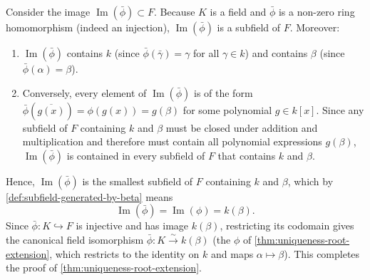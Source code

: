 \begin{proofWrapper}
\begin{content}
Consider the image $\operatorname{Im}(\bar{\phi}) \subset F$. Because $K$ is a field and $\bar{\phi}$ is a non-zero ring homomorphism (indeed an injection), $\operatorname{Im}(\bar{\phi})$ is a subfield of $F$. Moreover:
\begin{enumerate}[label=\textbf{(\arabic*)}]
    \item $\operatorname{Im}(\bar{\phi})$ contains $k$ (since $\bar{\phi}(\bar{\gamma}) = \gamma$ for all $\gamma \in k$) and contains $\beta$ (since $\bar{\phi}(\alpha) = \beta$).
    \item Conversely, every element of $\operatorname{Im}(\bar{\phi})$ is of the form $\bar{\phi}(\overline{g(x)}) = \phi(g(x)) = g(\beta)$ for some polynomial $g \in k[x]$. Since any subfield of $F$ containing $k$ and $\beta$ must be closed under addition and multiplication and therefore must contain all polynomial expressions $g(\beta)$, $\operatorname{Im}(\bar{\phi})$ is contained in every subfield of $F$ that contains $k$ and $\beta$.
\end{enumerate}
Hence, $\operatorname{Im}(\bar{\phi})$ is the smallest subfield of $F$ containing $k$ and $\beta$, which by \cref{def:subfield-generated-by-beta} means
\[
\operatorname{Im}(\bar{\phi}) = \operatorname{Im}(\phi) = k(\beta).
\]
Since $\bar{\phi} \colon K \hookrightarrow F$ is injective and has image $k(\beta)$, restricting its codomain gives the canonical field isomorphism $\bar{\phi} \colon K \xrightarrow{\sim} k(\beta)$ (the $\phi$ of \cref{thm:uniqueness-root-extension}, which restricts to the identity on $k$ and maps $\alpha \mapsto \beta$). This completes the proof of \cref{thm:uniqueness-root-extension}.
\end{content}

\end{proofWrapper}

